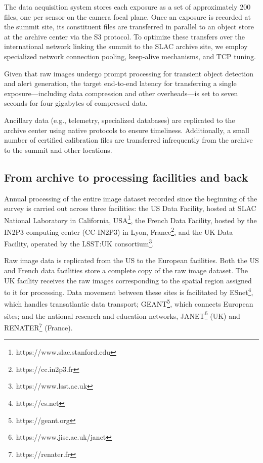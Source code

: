 \documentclass{webofc}
\begin{document}
The data acquisition system stores each exposure as a set of approximately 200 files, one per sensor on the camera focal plane. Once an exposure is recorded at the summit site, its constituent files are transferred in parallel to an object store at the archive center via the S3 protocol. To optimize these transfers over the international network linking the summit to the SLAC archive site, we employ specialized network connection pooling, keep-alive mechanisms, and TCP tuning.

Given that raw images undergo prompt processing for transient object detection and alert generation, the target end-to-end latency for transferring a single exposure—including data compression and other overheads—is set to seven seconds for four gigabytes of compressed data.

Ancillary data (e.g., telemetry, specialized databases) are replicated to the archive center using native protocols to ensure timeliness. Additionally, a small number of certified calibration files are transferred infrequently from the archive to the summit and other locations.

\subsection{From archive to processing facilities and back}
\label{summit-to-data-facilities}

Annual processing of the entire image dataset recorded since the beginning of the survey is carried out across three facilities: the US Data Facility, hosted at SLAC National Laboratory in California, USA\footnote{https://www.slac.stanford.edu}, the French Data Facility, hosted by the IN2P3 computing center (CC-IN2P3) in Lyon, France\footnote{https://cc.in2p3.fr}, and the UK Data Facility, operated by the LSST:UK consortium\footnote{https://www.lsst.ac.uk}.

Raw image data is replicated from the US to the European facilities. Both the US and French data facilities store a complete copy of the raw image dataset. The UK facility receives the raw images corresponding to the spatial region assigned to it for processing. Data movement between these sites is facilitated by ESnet\footnote{https://es.net}, which handles transatlantic data transport; GEANT\footnote{https://geant.org}, which connects European sites; and the national research and education networks, JANET\footnote{https://www.jisc.ac.uk/janet} (UK) and RENATER\footnote{https://renater.fr} (France).
\end{document}
